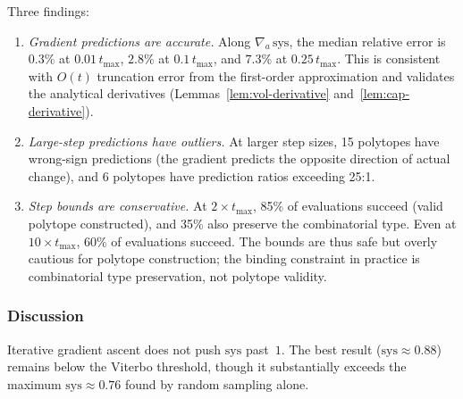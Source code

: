 Three findings:
\begin{enumerate}
\item \emph{Gradient predictions are accurate.}
  Along $\nabla_a\,\mathrm{sys}$, the median relative error is $0.3\%$
  at $0.01\,t_{\max}$, $2.8\%$ at $0.1\,t_{\max}$, and $7.3\%$ at
  $0.25\,t_{\max}$.
  This is consistent with $O(t)$ truncation error from the first-order
  approximation and validates the analytical derivatives
  (Lemmas~\ref{lem:vol-derivative} and~\ref{lem:cap-derivative}).

\item \emph{Large-step predictions have outliers.}
  At larger step sizes, 15 polytopes have wrong-sign predictions
  (the gradient predicts the opposite direction of actual change),
  and 6 polytopes have prediction ratios exceeding 25:1.

\item \emph{Step bounds are conservative.}
  At $2\times t_{\max}$, 85\% of evaluations succeed (valid polytope
  constructed), and 35\% also preserve the combinatorial type.
  Even at $10\times t_{\max}$, 60\% of evaluations succeed.
  The bounds are thus safe but overly cautious for polytope
  construction; the binding constraint in practice is
  combinatorial type preservation, not polytope validity.
\end{enumerate}

\subsubsection*{Discussion}

Iterative gradient ascent does not push $\mathrm{sys}$ past~$1$.
The best result ($\mathrm{sys} \approx 0.88$) remains below the
Viterbo threshold, though it substantially exceeds the maximum
$\mathrm{sys} \approx 0.76$ found by random sampling alone.


